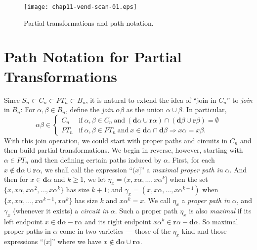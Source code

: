 \documentclass{surv-l}
\numberwithin{equation}{section}
\numberwithin{table}{section}
\numberwithin{figure}{section}
\theoremstyle{definition}
\begin{document}
\begin{figure}[!h]
\texttt{[image: chap11-vend-scan-01.eps]}
\caption{Partial transformations and path notation.\label{fig11.50.1}}
\end{figure}

\section{Path Notation for Partial Transformations}\label{sec11.51}

Since $S_{n}\subset C_{n}\subset PT_{n}\subset B_{n}$, it is
natural to extend the idea of ``join in $C_{n}$'' to \emph{join}
in $B_{n}$: For $\alpha,\beta\in B_{n}$, define the \emph{join}
$\alpha\beta$ as the union $\alpha\cup\beta$. In particular,
\[
\alpha\beta\in\begin{cases}
C_{n} & \mathrm{if}\ \alpha,\beta\in C_{n}\ \mathrm{and}\ (\mathbf{d}\alpha\cup \mathbf{r}\alpha)\cap(\mathbf{d}\beta\cup \mathbf{r}\beta)=\emptyset\\
PT_{n} & \mathrm{if}\ \alpha,\beta\in PT_{n}\ \mathrm{and}\ x\in \mathbf{d}\alpha\cap
\mathbf{d}\beta\Rightarrow x\alpha=x\beta.
\end{cases}
\]
With this join operation, we could start with proper paths and
circuits in $C_{n}$ and then build partial transformations. We
begin in reverse, however, starting with $\alpha\in
PT_{n}$ and then defining certain paths induced by $\alpha$.
First, for each $x\not\in \mathbf{d}\alpha\cup \mathbf{r}\alpha$,
we shall call the expression ``$(x]$'' a \emph{maximal proper path
in} $\alpha$. And then for $x\in
\mathbf{d}\alpha$ and $k\geq 1$, we let $\eta_{x}=(x,
x\alpha,\ldots, x\alpha^{k}]$ when the set $\{x,
x\alpha,x\alpha^{2},\ldots, x\alpha^{k}\}$ has size $k+1$; and
$\gamma_{x}=(x, x\alpha,\ldots, x\alpha^{k-1})$ when $\{x,
x\alpha,\ldots, x\alpha^{k-1}, x\alpha^{k}\}$ has size $k$ and
$x\alpha^{k}=x$. We call $\eta_{x}$ a \emph{proper path in}
$\alpha$, and $\gamma_{x}$ (whenever it exists) a \emph{circuit
in} $\alpha$. Such a proper path $\eta_{x}$ is also \emph{maximal}
if its left endpoint $ x\in \mathbf{d}\alpha-\mathbf{r}\alpha$ and
its right endpoint $ x\alpha^{k}\in
\mathbf{r}\alpha-\mathbf{d}\alpha$. So maximal proper paths in
$\alpha$ come in two varieties --- those of the $\eta_{x}$ kind
and those expressions ``$(x]$'' where we have $x\not\in
\mathbf{d}\alpha\cup \mathbf{r}\alpha$.
\end{document}
